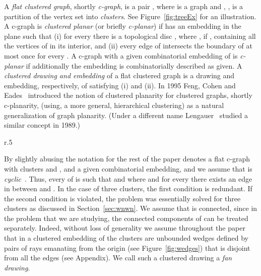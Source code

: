 \documentclass{llncs}
\newif\iflong
\begin{document}
 


A \emph{flat clustered graph}, shortly  \emph{c-graph}, is a pair , where  is a graph and , , is a partition of the
vertex set into \emph{clusters}. See Figure~\ref{fig:treeEx} for an illustration.
A  c-graph  is \emph{clustered planar} (or briefly \emph{c-planar}) if  has an
 embedding in the plane such that (i)
for every  there is a topological disc , where , if ,
 containing all the vertices of  in its interior, and (ii)
 every edge of  intersects the boundary of  at most once for every .
A c-graph   with a given combinatorial embedding of  is \emph{c-planar} 
if additionally the embedding is combinatorially described as given.
 A \emph{clustered drawing and embedding} of a flat clustered graph  is a drawing and embedding, respectively,
 of  satisfying (i) and (ii).
In 1995
 Feng, Cohen and Eades~\cite{FCEa95,FCEb95} introduced the notion of clustered planarity for clustered graphs, shortly c-planarity, (using, a more general, hierarchical clustering)
as a natural generalization of graph planarity. (Under a different name
Lengauer~\cite{L89} studied a similar concept in 1989.)


\begin{wrapfigure}{r}{.5\textwidth}
  \centering
\centering
{}
\caption{A c-graph that is not c-planar (left); and a c-planar c-graph (right).}
\label{fig:treeEx}
\end{wrapfigure}

By slightly abusing the notation for the rest of the paper  denotes  a flat c-graph  with  clusters
 and , and a given combinatorial embedding, and we assume that  is \emph{cyclic}~\cite[Section 6]{FKMP15}. Thus, every  of  is such that
 and  where  and for every
 there exists an edge in  between  and .
In the case of three clusters, the first condition is redundant.
If the second condition is violated, the problem was essentially solved for three clusters as discussed in
Section~\ref{sec:wnwn}.
We assume that  is connected, since in the problem that we are studying, the connected components of  can be treated separately. Indeed, \iflong as we show in Section~\ref{sec:fan} \fi without loss of generality  we  assume throughout the paper that in a clustered embedding of  the clusters are unbounded wedges defined by pairs of rays emanating from the origin (see Figure~\ref{fig:wedges}) that is disjoint from all the edges (see Appendix). We call such a clustered drawing  a \emph{fan drawing}. \\
\end{document}
